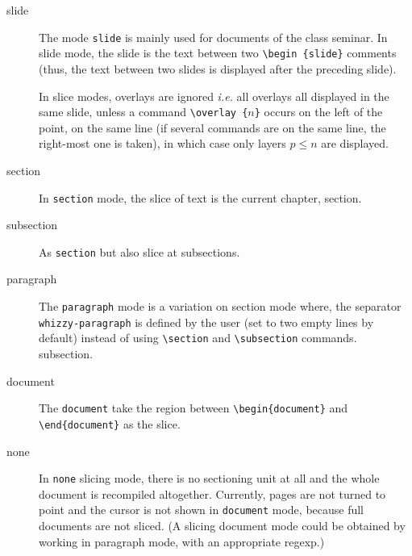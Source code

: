\documentclass{article}
\let \lst \verb
\begin{document}
\begin{description}

\item [slide]

The mode \lst"slide"  is mainly used for documents of the class seminar. 
In slide mode, the slide is the text between two \lst"\begin {slide}"
comments (thus,  the text between two slides is displayed after the
preceding slide).  

In slice modes, overlays are ignored {\em i.e.} all overlays all displayed in
the same slide, unless a command
\lst"\overlay {"$n$\lst"}" occurs on the left of the point, on the same line
(if several commands are on the same line, the 
right-most one is taken), in which case only layers $p \le n$ are displayed.

\item [section]
In \lst"section" mode, the slice of text is the current chapter, section.

\item [subsection]
As \lst"section" but also slice at subsections. 

\item [paragraph]
The \lst"paragraph" mode is a variation on section mode where, the separator
\lst"whizzy-paragraph" is defined by the user (set to two empty lines by
default) instead of using \lst"\section"  and \lst"\subsection" commands. 
subsection.

\item [document]
The \lst"document" take the region between \lst"\begin{document}"
and \lst"\end"\lst"{document}" as the slice. 

\item [none]
In \lst"none" slicing mode, there is no sectioning unit at all and
the whole document is recompiled altogether. 
Currently, pages are not turned to point and the 
cursor is not shown in \lst"document" mode, because full documents are not
sliced. (A slicing document mode could be obtained by working in paragraph
mode, with an appropriate regexp.)

\end{description}
\end{document}
